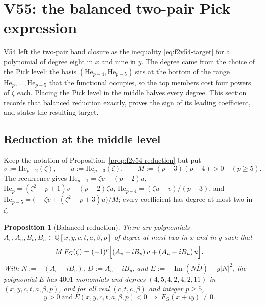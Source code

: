 \documentclass[11pt]{article}
\newtheorem{proposition}[theorem]{Proposition}
\theoremstyle{definition}
\theoremstyle{remark}
\begin{document}




\clearpage
\section{V55: the balanced two-pair Pick expression}
\label{sec:f2v55-balanced}
\begingroup
\setcounter{equation}{0}
\renewcommand{\theequation}{N55.\arabic{equation}}
\renewcommand{\theHequation}{f2v55.\arabic{equation}}

V54 left the two-pair band closure as the inequality
\eqref{eq:f2v54-target} for a polynomial of degree eight in \(x\) and nine
in \(y\).  The degree came from the choice of the Pick level: the basis
\((\mathrm{He}_{p-4},\mathrm{He}_{p-5})\) sits at the bottom of the range
\(\mathrm{He}_p,\ldots,\mathrm{He}_{p-5}\) that the functional occupies,
so the top members cost four powers of \(\zeta\) each.  Placing the Pick
level in the middle halves every degree.  This section records that
balanced reduction exactly, proves the sign of its leading coefficient,
and states the resulting target.

\subsection{Reduction at the middle level}

Keep the notation of Proposition~\ref{prop:f2v54-reduction} but put
\begin{equation}
 v:=\mathrm{He}_{p-2}(\zeta),\qquad u:=\mathrm{He}_{p-3}(\zeta),\qquad
 M:=(p-3)(p-4)>0\quad(p\ge5).
 \label{eq:f2v55-basis}
\end{equation}
The recurrence gives \(\mathrm{He}_{p-1}=\zeta v-(p-2)u\),
\(\mathrm{He}_p=(\zeta^2-p+1)v-(p-2)\zeta u\),
\(\mathrm{He}_{p-4}=(\zeta u-v)/(p-3)\), and
\(\mathrm{He}_{p-5}=\bigl(-\zeta v+(\zeta^2-p+3)u\bigr)/M\); every
coefficient has degree at most two in \(\zeta\).

\begin{proposition}[Balanced reduction]
\label{prop:f2v55-reduction}
There are polynomials \(A_v,A_u,B_v,B_u\in\mathbb Q[x,y,c,t,a,\beta,p]\)
of degree at most two in \(x\) and in \(y\) such that
\begin{equation}
 M\,F_G(\zeta)=(-1)^p\Bigl[(A_v-iB_v)\,v+(A_u-iB_u)\,u\Bigr].
 \label{eq:f2v55-FG}
\end{equation}
With \(N:=-(A_v-iB_v)\), \(D:=A_u-iB_u\), and
\(E:=-\operatorname{Im}(N\overline D)-y|N|^2\), the polynomial \(E\) has
\(4001\) monomials and degrees \((4,5,4,2,4,2,11)\) in
\((x,y,c,t,a,\beta,p)\), and for all real \((c,t,a,\beta)\) and integer
\(p\ge5\),
\begin{equation}
 \boxed{\;y>0\ \text{and}\ E(x,y,c,t,a,\beta,p)<0\ \Longrightarrow\ F_G(x+iy)\ne0.\;}
 \label{eq:f2v55-criterion}
\end{equation}
\end{proposition}
\end{document}

